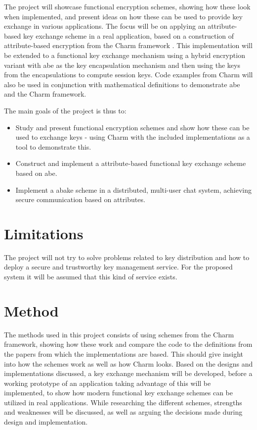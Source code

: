 The project will showcase functional encryption schemes, showing how these look when implemented, and present ideas on how these can be used to provide key exchange in various applications. The focus will be on applying an attribute-based key exchange scheme in a real application, based on a construction of attribute-based encryption from the Charm framework \cite{DBLP:Charm13}. This implementation will be extended to a functional key exchange mechanism using a hybrid encryption variant with \gls{abe} as the key encapsulation mechanism and then using the keys from the encapsulations to compute session keys. Code examples from Charm will also be used in conjunction with mathematical definitions to demonstrate \gls{abe} and the Charm framework. 
\par The main goals of the project is thus to:
\begin{itemize}
\item Study and present functional encryption schemes and show how these can be used to exchange keys - using Charm with the included implementations as a tool to demonstrate this.
\item Construct and implement a attribute-based functional key exchange scheme based on \gls{abe}.
\item Implement a \gls{abake} scheme in a distributed, multi-user chat system, achieving secure communication based on attributes.
\end{itemize}

\section{Limitations}\label{sec:limitations}
The project will not try to solve problems related to key distribution and how to deploy a secure and trustworthy key management service. For the proposed system it will be assumed that this kind of service exists.

\section{Method}
The methods used in this project consists of using schemes from the Charm framework, showing how these work and compare the code to the definitions from the papers from which the implementations are based. This should give insight into how the schemes work as well as how Charm looks. Based on the designs and implementations discussed, a key exchange mechanism will be developed, before a working prototype of an application taking advantage of this will be implemented, to show how modern functional key exchange schemes can be utilized in real applications. While researching the different schemes, strengths and weaknesses will be discussed, as well as arguing the decisions made during design and implementation.


